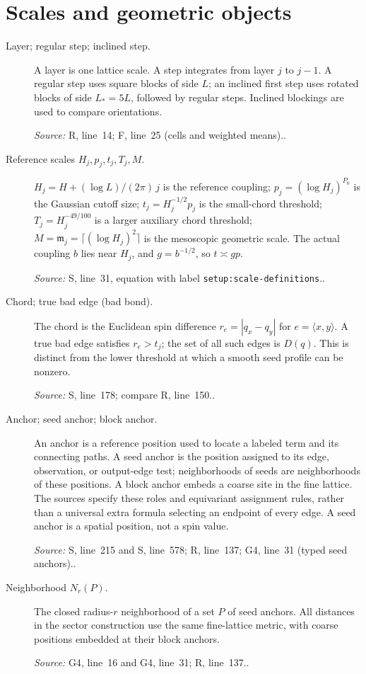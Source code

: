 \documentclass[11pt]{article}
\newcommand{\src}[2]{\textsf{#1}, line~#2}
\newcommand{\where}[1]{\par{\small\textit{Source:} #1.}}
\begin{document}
\section*{Scales and geometric objects}
\begin{description}
\item[Layer; regular step; inclined step.]
A layer is one lattice scale.  A step integrates from layer \(j\) to
\(j-1\).  A regular step uses square blocks of side \(L\); an inclined
first step uses rotated blocks of side \(L_*=5L\), followed by regular
steps.  Inclined blockings are used to compare orientations.
\where{\src{R}{14}; \src{F}{25} (cells and weighted means).}

\item[Reference scales \(H_j,p_j,t_j,T_j,M\).]
\(H_j=H+(\log L)/(2\pi)\,j\) is the reference coupling;
\(p_j=(\log H_j)^{P_0}\) is the Gaussian cutoff size;
\(t_j=H_j^{-1/2}p_j\) is the small-chord threshold;
\(T_j=H_j^{-49/100}\) is a larger auxiliary chord threshold;
\(M=\mathfrak m_j=\lceil(\log H_j)^2\rceil\) is the mesoscopic
geometric scale.  The actual coupling \(b\) lies near \(H_j\), and
\(g=b^{-1/2}\), so \(t\asymp gp\).
\where{\src{S}{31}, equation with label \texttt{setup:scale-definitions}.}

\item[Chord; true bad edge (bad bond).]
The chord is the Euclidean spin difference
\(r_e=|q_x-q_y|\) for \(e=\langle x,y\rangle\).  A true bad edge
satisfies \(r_e>t_j\); the set of all such edges is \(D(q)\).
This is distinct from the lower threshold at which a smooth seed
profile can be nonzero.
\where{\src{S}{178}; compare \src{R}{150}.}

\item[Anchor; seed anchor; block anchor.]
An anchor is a reference position used to locate a labeled term and
its connecting paths.  A seed anchor is the position assigned to its
edge, observation, or output-edge test; neighborhoods of seeds are
neighborhoods of these positions.  A block anchor embeds a coarse site
in the fine lattice.  The sources specify these roles and equivariant
assignment rules, rather than a universal extra formula selecting an
endpoint of every edge.  A seed anchor is a spatial position, not a
spin value.
\where{\src{S}{215} and \src{S}{578}; \src{R}{137};
\src{G4}{31} (typed seed anchors).}

\item[Neighborhood \(N_r(P)\).]
The closed radius-\(r\) neighborhood of a set \(P\) of seed anchors.
All distances in the sector construction use the same fine-lattice
metric, with coarse positions embedded at their block anchors.
\where{\src{G4}{16} and \src{G4}{31}; \src{R}{137}.}


\end{description}
\end{document}
